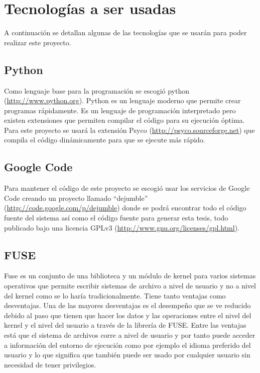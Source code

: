 \section{Tecnologías a ser usadas}

A continuación se detallan algunas de las tecnologías que se usarán para poder realizar este proyecto.

\subsection{Python}

Como lenguaje base para la programación se escogió python (\url{http://www.python.org}). Python es un lenguaje moderno que permite crear programas rápidamente. Es un lenguaje de programación interpretado pero existen extensiones que permiten compilar el código para su ejecución óptima. Para este proyecto se usará la extensión Psyco (\url{http://psyco.sourceforge.net}) que compila el código dinámicamente para que se ejecute más rápido.

\subsection{Google Code}

Para mantener el código de este proyecto se escogió usar los servicios de Google Code creando un proyecto llamado ``dejumble'' (\url{http://code.google.com/p/dejumble}) donde se podrá encontrar todo el código fuente del sistema así como el código fuente para generar esta tesis, todo publicado bajo una licencia GPLv3 (\url{http://www.gnu.org/licenses/gpl.html}).

\subsection{FUSE}

Fuse es un conjunto de una biblioteca y un módulo de kernel para varios sistemas operativos que permite escribir sistemas de archivo a nivel de usuario y no a nivel del kernel como se lo haría tradicionalmente. Tiene tanto ventajas como desventajas. Una de las mayores desventajas es el desempeño que se ve reducido debido al paso que tienen que hacer los datos y las operaciones entre el nivel del kernel y el nivel del usuario a través de la librería de FUSE. Entre las ventajas está que el sistema de archivos corre a nivel de usuario y por tanto puede acceder a información del entorno de ejecución como por ejemplo el idioma preferido del usuario y lo que significa que también puede ser usado por cualquier usuario sin necesidad de tener privilegios.


